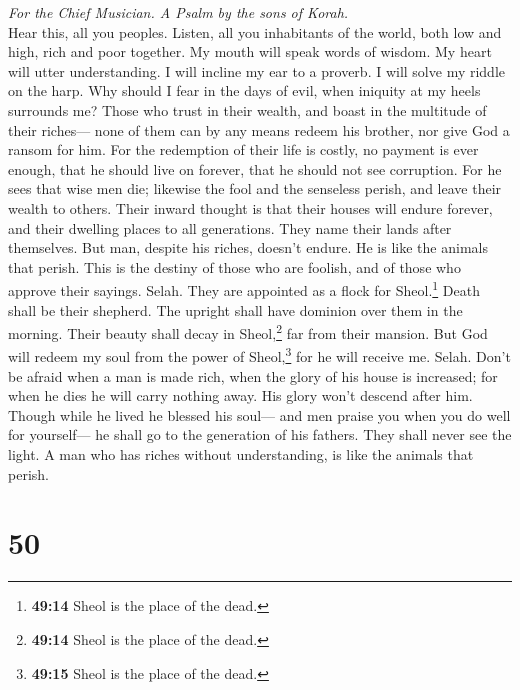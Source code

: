 \emph{For the Chief Musician. A Psalm by the sons of Korah.}\\
 Hear this, all you peoples. Listen, all you inhabitants
of the world,  both low and high, rich and poor together.
 My mouth will speak words of wisdom. My heart will utter
understanding.  I will incline my ear to a proverb. I will
solve my riddle on the harp.  Why should I fear in the
days of evil, when iniquity at my heels surrounds me? 
Those who trust in their wealth, and boast in the multitude of their
riches---  none of them can by any means redeem his
brother, nor give God a ransom for him.  For the
redemption of their life is costly, no payment is ever enough,
 that he should live on forever, that he should not see
corruption.  For he sees that wise men die; likewise the
fool and the senseless perish, and leave their wealth to others.
 Their inward thought is that their houses will endure
forever, and their dwelling places to all generations. They name their
lands after themselves.  But man, despite his riches,
doesn't endure. He is like the animals that perish.  This
is the destiny of those who are foolish, and of those who approve their
sayings. Selah.  They are appointed as a flock for
Sheol.\footnote{\textbf{49:14} Sheol is the place of the dead.} Death
shall be their shepherd. The upright shall have dominion over them in
the morning. Their beauty shall decay in Sheol,\footnote{\textbf{49:14}
  Sheol is the place of the dead.} far from their mansion.
 But God will redeem my soul from the power of
Sheol,\footnote{\textbf{49:15} Sheol is the place of the dead.} for he
will receive me. Selah.  Don't be afraid when a man is
made rich, when the glory of his house is increased;  for
when he dies he will carry nothing away. His glory won't descend after
him.  Though while he lived he blessed his soul--- and
men praise you when you do well for yourself---  he shall
go to the generation of his fathers. They shall never see the light.
 A man who has riches without understanding, is like the
animals that perish.

\hypertarget{section-49}{%
\section{50}\label{section-49}}

